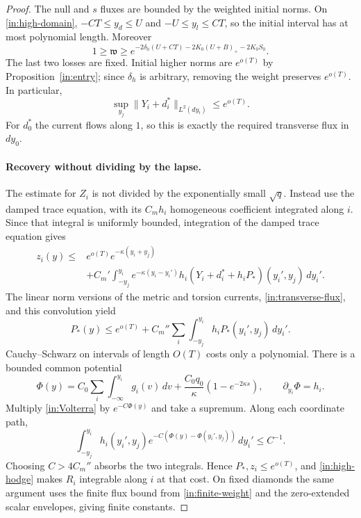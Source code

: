 \begin{proof}
The null and $s$ fluxes are bounded by the weighted initial norms.
On \eqref{in:high-domain},
$-CT\le y_d\le U$ and $-U\le y_l\le CT$, so the initial interval
has at most polynomial length. Moreover
\begin{equation}\label{in:weight-range}
 1\ge\mathfrak w\ge
 e^{-2\delta_h(U+CT)-2K_0(U+B)_+-2K_0S_0}.
\end{equation}
The last two losses are fixed. Initial higher norms are $e^{o(T)}$
by Proposition~\ref{in:entry}; since $\delta_h$ is arbitrary,
removing the weight preserves $e^{o(T)}$. In particular,
\begin{equation}\label{in:transverse-flux}
 \sup_{y_j}\|Y_i+d_i^*\|_{L^2(dy_i)}\le e^{o(T)}.
\end{equation}
For $d_0^*$ the current flows along $1$, so this is exactly the
required transverse flux in $dy_0$.

\paragraph{Recovery without dividing by the lapse.}
The estimate for $Z_i$ is not divided by the exponentially small
$\sqrt q$. Instead use the damped trace equation, with its
$C_mh_i$ homogeneous coefficient integrated along $i$. Since that
integral is uniformly bounded, integration of the damped trace equation gives
\begin{equation}\label{in:trace-convolution}
\begin{split}
 z_i(y)\le{}&e^{o(T)}e^{-\kappa(y_i+y_j)}\\
 &+C_m'\int_{-y_j}^{y_i}e^{-\kappa(y_i-y_i')}
       h_i(Y_i+d_i^*+h_iP_*)(y_i',y_j)\,dy_i'.
\end{split}
\end{equation}
The linear norm versions of the metric and torsion currents,
\eqref{in:transverse-flux}, and this convolution yield
\begin{equation}\label{in:Volterra}
 P_*(y)\le e^{o(T)}
       +C_m''\sum_i\int_{-y_j}^{y_i}
                 h_iP_*(y_i',y_j)\,dy_i'.
\end{equation}
Cauchy--Schwarz on intervals of length $O(T)$ costs only a polynomial.
There is a bounded common potential
\begin{equation}\label{in:potential}
 \Phi(y)=C_0\sum_i\int_{-\infty}^{y_i}g_i(v)\,dv
             +\frac{C_0q_0}{\kappa}(1-e^{-2\kappa s}),
 \qquad \partial_{y_i}\Phi=h_i.
\end{equation}
Multiply \eqref{in:Volterra} by $e^{-C\Phi(y)}$ and take a
supremum. Along each coordinate path,
\[
 \int_{-y_j}^{y_i}h_i(y_i',y_j)
       e^{-C(\Phi(y)-\Phi(y_i',y_j))}\,dy_i'\le C^{-1}.
\]
Choosing $C>4C_m''$ absorbs the two integrals. Hence
$P_*,z_i\le e^{o(T)}$, and \eqref{in:high-hodge} makes $R_i$
integrable along $i$ at that cost. On fixed diamonds the same argument
uses the finite flux bound from \eqref{in:finite-weight} and the
zero-extended scalar envelopes, giving finite constants.


\end{proof}
